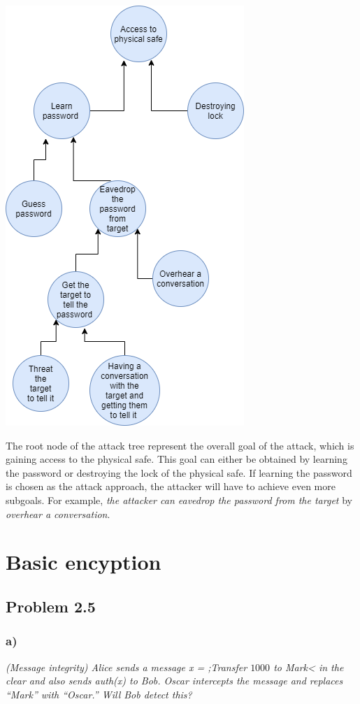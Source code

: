 \documentclass{article}
\begin{document}
\includegraphics[scale=0.55]{AttackTree.png}

The root node of the attack tree represent the overall goal of the attack, which is gaining access to the physical safe. This goal can either be obtained by learning the password or destroying the lock of the physical safe. If learning the password is chosen as the attack approach, the attacker will have to achieve even more subgoals. For example, \textit{the attacker can eavedrop the password from the target} by \textit{overhear a conversation}. 

\section{Basic encyption}
\subsection{Problem 2.5}
\subsubsection{a)}
\textit{(Message integrity) Alice sends a message x = ;Transfer $1000$ to Mark< in the clear and also sends auth(x) to Bob. Oscar intercepts the message and replaces “Mark” with “Oscar.” Will Bob detect this?}\\
\end{document}
